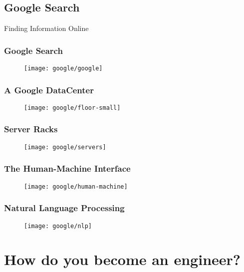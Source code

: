 \documentclass{beamer}
\begin{document}
\subsection{Google Search}
\begin{frame}[plain,c]
\begin{center}
\Huge Finding Information Online
\end{center}
\end{frame}


\begin{frame}
  \frametitle{Google Search}
  \begin{figure}
  \centering
  \texttt{[image: google/google]}
  \end{figure}
\end{frame}

\begin{frame}
  \frametitle{A Google DataCenter}
  \begin{figure}
  \centering
  \texttt{[image: google/floor-small]}
  \end{figure}
\end{frame}

\begin{frame}
  \frametitle{Server Racks}
  \begin{figure}
  \centering
  \texttt{[image: google/servers]}
  \end{figure}
\end{frame}

\begin{frame}
  \frametitle{The Human-Machine Interface}
  \begin{figure}
  \centering
  \texttt{[image: google/human-machine]}
  \end{figure}
\end{frame}

\begin{frame}
  \frametitle{Natural Language Processing}
  \begin{figure}
  \centering
  \texttt{[image: google/nlp]}
  \end{figure}
\end{frame}

\section{How do you become an engineer?}
\end{document}
